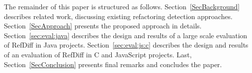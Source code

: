 The remainder of this paper is structured as follows.
Section~\ref{SecBackground} describes related work, discussing existing refactoring detection approaches.
Section~\ref{SecApproach} presents the proposed approach in details.
Section~\ref{sec:eval:java} describes the design and results of a large scale evaluation of RefDiff in Java projects.
Section~\ref{sec:eval:js:c} describes the design and results of an evaluation of RefDiff in C and JavaScript projects.
Last, Section~\ref{SecConclusion} presents final remarks and concludes the paper.
